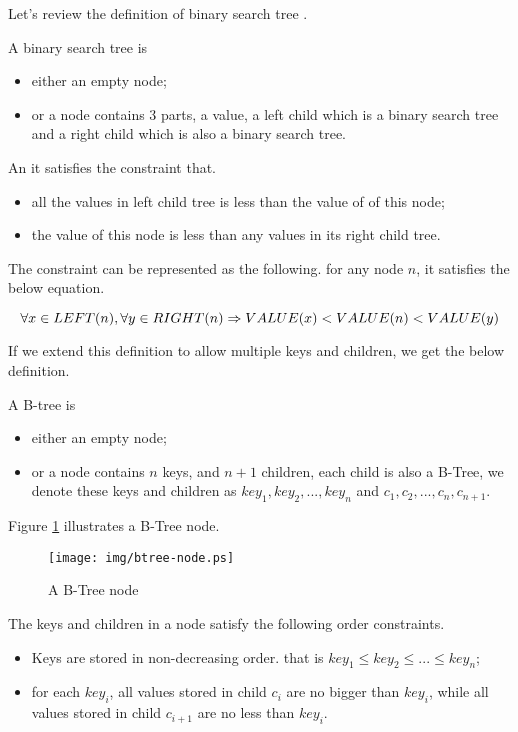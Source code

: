 \documentclass{article}
\begin{document}
Let's review the definition of binary search tree \cite{lxy-bst}.

A binary search tree is
\begin{itemize}
\item either an empty node;
\item or a node contains 3 parts, a value, a left child which is a
binary search tree and a right child which is also a binary search tree.
\end{itemize}

An it satisfies the constraint that.
\begin{itemize}
\item all the values in left child tree is less than the value of of this node;
\item the value of this node is less than any values in its right child tree.
\end{itemize}

The constraint can be represented as the following. for any node $n$,
it satisfies the below equation.

\begin{equation}
\forall x \in LEFT(n), \forall y \in RIGHT(n) \\
\Rightarrow VALUE(x)<VALUE(n)<VALUE(y)
\end{equation}

If we extend this definition to allow multiple keys and children, we get the
below definition.

A B-tree is
\begin{itemize}
\item either an empty node;
\item or a node contains $n$ keys, and $n+1$ children, each child is
also a B-Tree, we denote these keys and children as $key_1, key_2,
..., key_n$ and $c_1, c_2, ..., c_n, c_{n+1}$.
\end{itemize}

Figure \ref{fig:btree-node} illustrates a B-Tree node.

\begin{figure}[htbp]
       \begin{center}
	\texttt{[image: img/btree-node.ps]}
        \caption{A B-Tree node} \label{fig:btree-node}
       \end{center}
\end{figure}

The keys and children in a node satisfy the following order constraints.

\begin{itemize}
\item Keys are stored in non-decreasing order. that is $key_1 \leq
key_2 \leq ... \leq key_n$;
\item for each $key_i$, all values stored in child $c_i$ are no bigger
than $key_i$, while all values stored in child $c_{i+1}$ are no less
than $key_i$.
\end{itemize}
\end{document}
